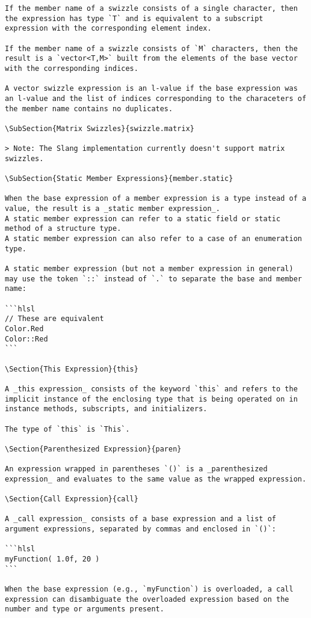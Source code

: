 \begin{verbatim}
If the member name of a swizzle consists of a single character, then the expression has type `T` and is equivalent to a subscript expression with the corresponding element index.

If the member name of a swizzle consists of `M` characters, then the result is a `vector<T,M>` built from the elements of the base vector with the corresponding indices.

A vector swizzle expression is an l-value if the base expression was an l-value and the list of indices corresponding to the characeters of the member name contains no duplicates.

\SubSection{Matrix Swizzles}{swizzle.matrix}

> Note: The Slang implementation currently doesn't support matrix swizzles.

\SubSection{Static Member Expressions}{member.static}

When the base expression of a member expression is a type instead of a value, the result is a _static member expression_.
A static member expression can refer to a static field or static method of a structure type.
A static member expression can also refer to a case of an enumeration type.

A static member expression (but not a member expression in general) may use the token `::` instead of `.` to separate the base and member name:

```hlsl
// These are equivalent
Color.Red
Color::Red
```

\Section{This Expression}{this}

A _this expression_ consists of the keyword `this` and refers to the implicit instance of the enclosing type that is being operated on in instance methods, subscripts, and initializers.

The type of `this` is `This`.

\Section{Parenthesized Expression}{paren}

An expression wrapped in parentheses `()` is a _parenthesized expression_ and evaluates to the same value as the wrapped expression.

\Section{Call Expression}{call}

A _call expression_ consists of a base expression and a list of argument expressions, separated by commas and enclosed in `()`:

```hlsl
myFunction( 1.0f, 20 )
```

When the base expression (e.g., `myFunction`) is overloaded, a call expression can disambiguate the overloaded expression based on the number and type or arguments present.


\end{verbatim}

